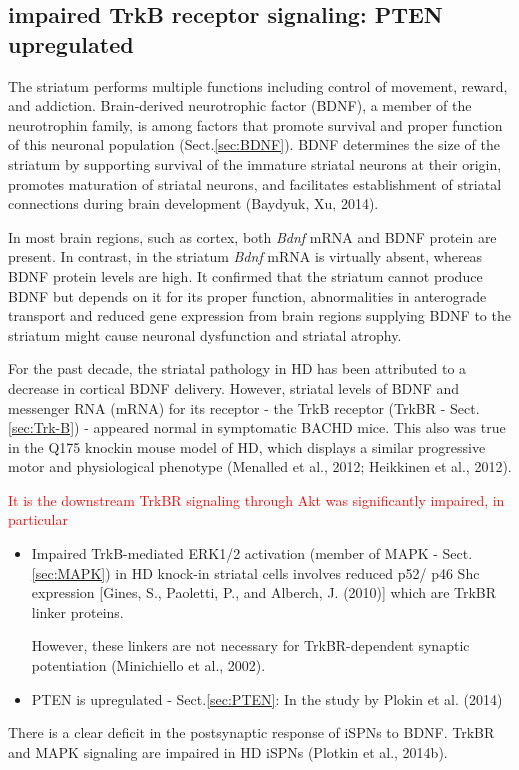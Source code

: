 \subsection{impaired TrkB receptor signaling: PTEN upregulated}
\label{sec:HD-theory-impaired-TrkBR-signaling}
\label{sec:HD-theory-impaired-PTEN}

The striatum performs multiple functions including control of movement, reward,
and addiction. Brain-derived neurotrophic factor (BDNF), a member of the
neurotrophin family, is among factors that promote survival and proper function
of this neuronal population (Sect.\ref{sec:BDNF}). BDNF determines the size of
the striatum by supporting survival of the immature striatal neurons at their
origin, promotes maturation of striatal neurons, and facilitates establishment
of striatal connections during brain development (Baydyuk, Xu, 2014).

In most brain regions, such as cortex, both {\it Bdnf} mRNA and BDNF protein are
present. In contrast, in the striatum {\it Bdnf} mRNA is virtually absent,
whereas BDNF protein levels are high.
It confirmed that the striatum cannot produce BDNF but depends on it for its
proper function, abnormalities in anterograde transport and reduced gene
expression from brain regions supplying BDNF to the striatum might cause
neuronal dysfunction and striatal atrophy.


For the past decade, the striatal pathology in HD has been attributed to a
decrease in cortical BDNF delivery.
However, striatal levels of BDNF and messenger RNA (mRNA) for its receptor - the
TrkB receptor (TrkBR - Sect.\ref{sec:Trk-B}) - appeared normal in symptomatic
BACHD mice. This also was true in the Q175 knockin mouse model of HD, which
displays a similar progressive motor and physiological phenotype (Menalled et
al., 2012; Heikkinen et al., 2012).

\textcolor{red}{It is the downstream TrkBR signaling through Akt was
significantly impaired, in particular}
\begin{itemize}
  
  \item  Impaired TrkB-mediated ERK1/2 activation (member of MAPK -
  Sect.\ref{sec:MAPK}) in HD knock-in striatal cells involves
  reduced p52/ p46 Shc expression [Gines, S., Paoletti, P., and Alberch, J.
  (2010)] which are TrkBR linker proteins.
  
  However, these linkers are not necessary for TrkBR-dependent synaptic
  potentiation (Minichiello et al., 2002).
  
  \item PTEN is upregulated - Sect.\ref{sec:PTEN}: In the study by Plokin et al.
  (2014)
\end{itemize}
There is a clear deficit in the postsynaptic response of iSPNs to BDNF. TrkBR
and MAPK signaling are impaired in HD iSPNs (Plotkin et al., 2014b).

